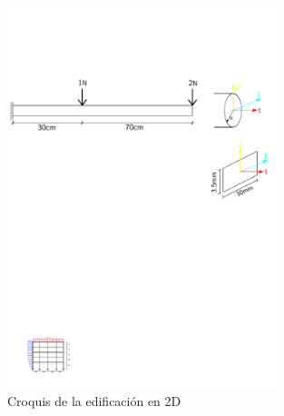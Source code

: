 \documentclass[a4paper,12pt]{article}
\begin{document}
\vspace{10mm}

\begin{figure}[hb]
    \centering
\includegraphics[width=0.7\textwidth]{RecorteP10}
\caption{Croquis de la edificación en 2D}
\label{fig:croquis}
\end{figure}
\end{document}
